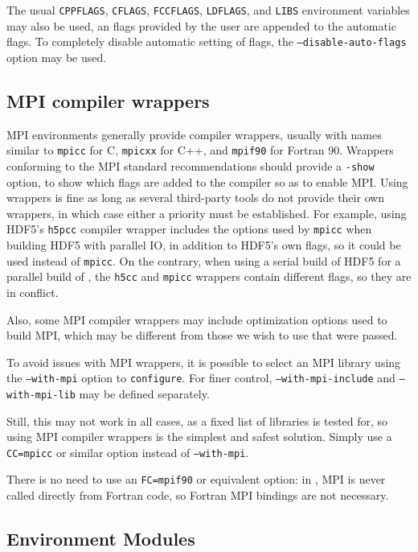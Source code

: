 \documentclass[a4paper,10pt,twoside]{csshortdoc}
\begin{document}
The usual \texttt{CPPFLAGS}, \texttt{CFLAGS},
\texttt{FCCFLAGS}, \texttt{LDFLAGS}, and \texttt{LIBS} environment variables
may also be used, an flags provided by the user are appended to the automatic
flags. To completely disable automatic setting of flags,
the \texttt{--disable-auto-flags} option may be used.

\subsection{MPI compiler wrappers\label{sec:config:mpicc}}

MPI environments generally provide compiler wrappers, usually
with names similar to \texttt{mpicc} for C, \texttt{mpicxx} for C++,
and \texttt{mpif90} for Fortran 90. Wrappers conforming to the
MPI standard recommendations should provide a \texttt{-show}
option, to show which flags are added to the compiler so as to
enable MPI. Using wrappers is fine as long as several third-party tools
do not provide their own wrappers, in which case either
a priority must be established. For example, using HDF5's
\texttt{h5pcc} compiler wrapper includes the options used by
\texttt{mpicc} when building HDF5 with parallel IO, in addition to
HDF5's own flags, so it could be used instead of \texttt{mpicc}.
On the contrary, when using a serial build of HDF5 for a parallel
build of \CS, the \texttt{h5cc} and \texttt{mpicc} wrappers
contain different flags, so they are in conflict.

Also, some MPI compiler wrappers may include optimization options
used to build MPI, which may be different from those we wish to use
that were passed.

To avoid issues with MPI wrappers, it is possible to select an
MPI library using the \texttt{--with-mpi} option to \texttt{configure}.
For finer control, \texttt{--with-mpi-include} and \texttt{--with-mpi-lib}
may be defined separately.

Still, this may not work in all cases, as a fixed list of libraries
is tested for, so using MPI compiler wrappers is the simplest and safest
solution. Simply use a \texttt{CC=mpicc} or similar option instead
of \texttt{--with-mpi}.

There is no need to use an \texttt{FC=mpif90} or equivalent option:
in \CS, MPI is never called directly from Fortran code,
so Fortran MPI bindings are not necessary.

\subsection{Environment Modules\label{sec:config:envmode}}
\end{document}
